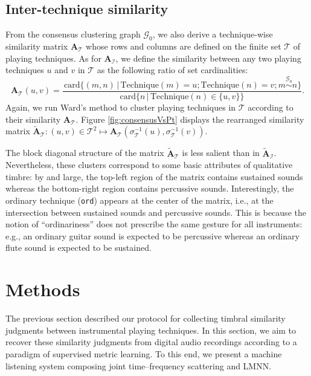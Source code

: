 \documentclass{bmcart}
\makeatletter
\newcommand*{\eg}{e.g.,\@\xspace}
\newcommand*{\ie}{i.e.,\@\xspace}
\newcommand{\Card}{\mathrm{card}}
\newcommand{\ml}[1]{\textcolor{blue}{ML: #1}\xspace}
\newcommand{\vl}[1]{\textcolor{red}{VL: #1}\xspace}
\newcommand{\nmu}{}
\makeatother
\begin{document}
\subsection*{Inter-technique similarity}
From the consensus clustering graph $\mathcal{G}_0$, we also derive a technique-wise similarity matrix $\mathbf{A}_{\mathcal{T}}$ whose rows and columns are defined on the finite set $\mathcal{T}$ of playing techniques.
As for $\mathbf{A}_{\mathcal{I}}$, we define the similarity between any two playing techniques $u$ and $v$ in $\mathcal{T}$ as the following ratio of set cardinalities:
\begin{equation}
\mathbf{A}_{\mathcal{T}}(u,v) = \dfrac{
\,\Card \big\{ (m, n) \,\vert\, \mathrm{Technique}(m)=u ; \mathrm{Technique}(n)=v ; m \overset{\mathcal{G}_0}{\sim} n \big\}
}{
\Card \big\{n \,\vert\, \mathrm{Technique}(n) \in \{ u, v \} \big\}
}.
\label{eq:technique-similarity}
\end{equation}
Again, we run Ward's method to cluster playing techniques in $\mathcal{T}$ according to their similarity $\mathbf{A}_{\mathcal{T}}$.
Figure \ref{fig:consensusVsPt} displays the rearranged similarity matrix $\widetilde{\mathbf{A}}_{\mathcal{T}} : (u,v)\in \mathcal{T}^2 \mapsto \mathbf{A}_{\mathcal{T}}(\sigma_{\mathcal{T}}^{-1}(u), \sigma_{\mathcal{T}}^{-1}(v))$.

The block diagonal structure of the matrix $\widetilde{\mathbf{A}}_{\mathcal{T}}$ is less salient than in $\widetilde{\mathbf{A}}_{\mathcal{I}}$.
Nevertheless, these clusters correspond to some basic attributes of qualitative timbre: by and large, the top-left region of the matrix contains sustained sounds whereas the bottom-right region contains percussive sounds.
Interestingly, the ordinary technique (\texttt{ord}) appears at the center of the matrix, \ie{} at the intersection between sustained sounds and percussive sounds.
This is because the notion of ``ordinariness'' does not prescribe the same gesture for all instruments: \eg{} an ordinary guitar sound is expected to be percussive whereas an ordinary flute sound is expected to be sustained.

\section*{\nmu Methods}
\label{sec:methods}
The previous section described our protocol for collecting timbral similarity judgments between instrumental playing techniques.
In this section, we aim to recover these similarity judgments from digital audio recordings according to a paradigm of supervised metric learning.
To this end, we present a machine listening system composing joint time--frequency scattering and LMNN.
\end{document}
